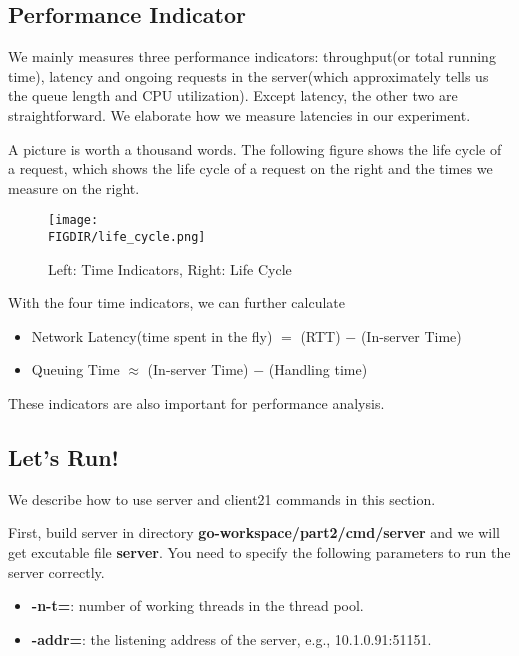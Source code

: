 \documentclass{article}
\begin{document}
\begin{spacing}{1.1}
\subsection{Performance Indicator}

We mainly measures three performance indicators: throughput(or total running time), latency and ongoing requests in the server(which approximately tells us the queue length and CPU utilization). Except latency, the other two are straightforward. We elaborate how we measure latencies in our experiment.

A picture is worth a thousand words. The following figure shows the life cycle of a request, which shows the life cycle of a request on the right and the times we measure on the right.

\begin{figure}[htbp]
    \centering
    \texttt{[image: \\FIGDIR/life\_cycle.png]}
    \label{fig:enter-label}
    \caption{Left: Time Indicators, Right: Life Cycle}
\end{figure}

With the four time indicators, we can further calculate
\begin{itemize}
    \item Network Latency(time spent in the fly) $=$ (RTT) $-$ (In-server Time)
    \item Queuing Time $\approx$ (In-server Time) $-$ (Handling time)
\end{itemize}
These indicators are also important for performance analysis.


\subsection{Let's Run!}

We describe how to use server and client21 commands in this section.

First, build server in directory \textbf{go-workspace/part2/cmd/server} and we will get excutable file \textbf{server}. You need to specify the following parameters to run the server correctly.
\begin{itemize}
    \setlength\itemsep{1pt}
    \item \textbf{-n-t=}: number of working threads in the thread pool.
    \item \textbf{-addr=}: the listening address of the server, e.g., 10.1.0.91:51151.
\end{itemize}


\end{spacing}
\end{document}
